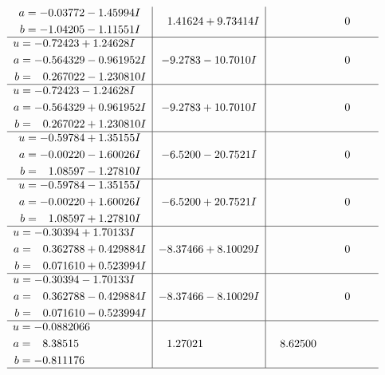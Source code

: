 \documentclass[1p]{elsarticle_modified}
\theoremstyle{definition}
\begin{document}
$$\begin{array}{c|c|c}
\begin{aligned}
a &= -0.03772 - 1.45994 I \\
b &= -1.04205 - 1.11551 I\end{aligned}
 & \phantom{-}1.41624 + 9.73414 I & \phantom{-0.000000 } 0 \\ \hline\begin{aligned}
u &= -0.72423 + 1.24628 I \\
a &= -0.564329 - 0.961952 I \\
b &= \phantom{-}0.267022 - 1.230810 I\end{aligned}
 & -9.2783 - 10.7010 I & \phantom{-0.000000 } 0 \\ \hline\begin{aligned}
u &= -0.72423 - 1.24628 I \\
a &= -0.564329 + 0.961952 I \\
b &= \phantom{-}0.267022 + 1.230810 I\end{aligned}
 & -9.2783 + 10.7010 I & \phantom{-0.000000 } 0 \\ \hline\begin{aligned}
u &= -0.59784 + 1.35155 I \\
a &= -0.00220 - 1.60026 I \\
b &= \phantom{-}1.08597 - 1.27810 I\end{aligned}
 & -6.5200 - 20.7521 I & \phantom{-0.000000 } 0 \\ \hline\begin{aligned}
u &= -0.59784 - 1.35155 I \\
a &= -0.00220 + 1.60026 I \\
b &= \phantom{-}1.08597 + 1.27810 I\end{aligned}
 & -6.5200 + 20.7521 I & \phantom{-0.000000 } 0 \\ \hline\begin{aligned}
u &= -0.30394 + 1.70133 I \\
a &= \phantom{-}0.362788 + 0.429884 I \\
b &= \phantom{-}0.071610 + 0.523994 I\end{aligned}
 & -8.37466 + 8.10029 I & \phantom{-0.000000 } 0 \\ \hline\begin{aligned}
u &= -0.30394 - 1.70133 I \\
a &= \phantom{-}0.362788 - 0.429884 I \\
b &= \phantom{-}0.071610 - 0.523994 I\end{aligned}
 & -8.37466 - 8.10029 I & \phantom{-0.000000 } 0 \\ \hline\begin{aligned}
u &= -0.0882066\phantom{ +0.000000I} \\
a &= \phantom{-}8.38515\phantom{ +0.000000I} \\
b &= -0.811176\phantom{ +0.000000I}\end{aligned}
 & \phantom{-}1.27021\phantom{ +0.000000I} & \phantom{-}8.62500\phantom{ +0.000000I}\\
 \hline 
 \end{array}$$\newpage\newpage\renewcommand{\arraystretch}{1}
\end{document}

